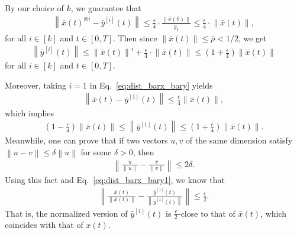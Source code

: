 \documentclass[superscriptaddress,onecolumn,nofootinbib,longbibliography,a4paper,accepted=2026-09-29]{quantumarticle}
\theoremstyle{plain}
\theoremstyle{definition}
\numberwithin{thm}{section}
\numberwithin{assumption}{section}
\numberwithin{lemma}{section}
\numberwithin{prop}{section}
\numberwithin{cor}{section}
\numberwithin{definition}{section}
\numberwithin{rmk}{section}
\numberwithin{equation}{section}
\newcommand{\norm}[1]     {\left\| #1 \right\|}
\newcommand{\lrb}[1]{\left ( #1 \right )}
\begin{document}
By our choice of $k$, we guarantee that
\begin{align}
\norm{\bar{x}(t)^{\otimes i}-\bar{y}^{[i]}(t)} \le \frac{\epsilon}{4} \cdot \frac{\norm{\bar{x}(0)}}{g_1}
\le \frac{\epsilon}{4} \cdot\norm{\bar{x}(t)},
\label{eq:dist_barx_bary}
\end{align}
for all $i \in [k]$ and $t \in [0,T]$. Then since $\norm{\bar{x}(t)}\le \bar{\rho} < 1/2$, we get
\begin{align}
    \norm{\bar{y}^{[i]}(t)} \le \norm{\bar{x}(t)}^{i}+\frac{\epsilon}{4}\cdot \norm{\bar{x}(t)} \le 
    \lrb{1+\frac{\epsilon}{4}} \norm{\bar{x}(t)}
    \label{eq:upper_bound_norm_baryi}
\end{align}
for all $i \in [k]$ and $t \in [0, T]$.

Moreover, taking $i=1$ in Eq.~\eqref{eq:dist_barx_bary} yields
\begin{align}
    \norm{\bar{x}(t)-\bar{y}^{[1]}(t)} \le \frac{\epsilon}{4} \norm{\bar{x}(t)},
    \label{eq:dist_barx_bary1}
\end{align}
which implies 
\begin{align}
\lrb{1-\frac{\epsilon}{4}} \norm{\bar{x}(t)}
\le \norm{\bar{y}^{[1]}(t)}
\le \lrb{1+\frac{\epsilon}{4}} \norm{\bar{x}(t)}.
\label{eq:lower_bound_norm_bary1}
\end{align}
Meanwhile, one can prove that if two vectors $u, v$ of the same dimension satisfy $\norm{u-v}\le \delta \norm{u}$ for some  $\delta>0$, then
\begin{align}
    \norm{\frac{u}{\norm{u}}-\frac{v}{\norm{v}}} \le 2\delta.
\end{align}
Using this fact and Eq.~\eqref{eq:dist_barx_bary1}, we know that
\begin{align}
    \norm{\frac{\bar{x}(t)}{\norm{\bar{x}(t)}} - \frac{\bar{y}^{[1]}(t)}{\norm{\bar{y}^{[1]}(t)}}} \le \frac{\epsilon}{2}.
    \label{eq:dist_normalized_xt_y1t}
\end{align}
That is, the normalized version of $\bar{y}^{[1]}(t)$ is $\frac{\epsilon}{2}$-close to that of $\bar{x}(t)$, which coincides with that of $x(t)$.
\end{document}
